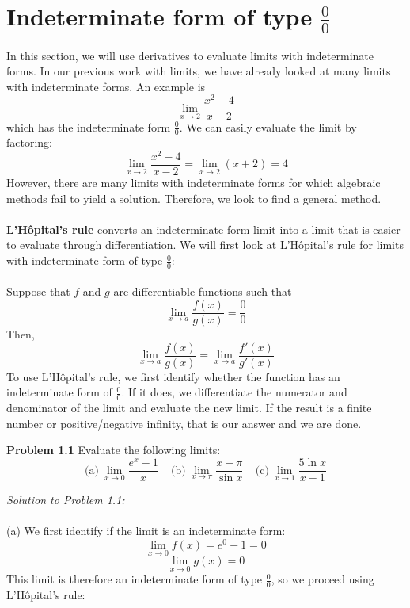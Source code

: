 \documentclass[11pt]{scrartcl}
\begin{document}
\maketitle
\noindent

\section{Indeterminate form of type $\frac{0}{0}$}
\noindent 
In this section, we will use derivatives to evaluate limits with indeterminate forms. In our previous work with limits, we have already looked at many limits with indeterminate forms. An example is 
$$\lim_{x \to 2} \frac{x^2-4}{x-2}$$
\noindent 
which has the indeterminate form $\frac{0}{0}$. 
We can easily evaluate the limit by factoring:
$$\lim_{x \to 2} \frac{x^2-4}{x-2}=\lim_{x \to 2}(x+2)=4$$
\noindent 
However, there are many limits with indeterminate forms for which algebraic methods fail to yield a solution. Therefore, we look to find a general method. \\
\\
\noindent 
\textbf{L'Hôpital's rule} converts an indeterminate form limit into a limit that is easier to evaluate through differentiation. We will first look at L'Hôpital's rule for limits with indeterminate form of type $\frac{0}{0}$: \\
\\
\noindent 
Suppose that $f$ and $g$ are differentiable functions such that 
$$\lim_{x \to a}\frac{f(x)}{g(x)}=\frac{0}{0}$$
Then,  
$$\lim_{x \to a}\frac{f(x)}{g(x)}=\lim_{x \to a}\frac{f'(x)}{g'(x)}$$
\noindent 
To use L'Hôpital's rule, we first identify whether the function has an indeterminate form of $\frac{0}{0}$. If it does, we differentiate the numerator and denominator of the limit and evaluate the new limit. If the result is a finite number or positive/negative infinity, that is our answer and we are done. 
\begin{tcolorbox}
[colback=purple!5!white,colframe=purple!75!black]
\textbf{Problem 1.1} Evaluate the following limits: 
$$\text{(a)} \ \lim_{x \to 0} \frac{e^x-1}{x} \ \ \ \ \ \text{(b)} \ \lim_{x \to \pi} \frac{x- \pi}{\sin x} \ \ \ \ \ \text{(c)} \ \lim_{x \to 1} \frac{5 \ln x}{x-1}$$
\end{tcolorbox}
\noindent 
\textit{Solution to Problem 1.1:} \\
\\
\noindent 
(a) We first identify if the limit is an indeterminate form: 
$$\lim_{x \to 0}f(x)=e^0-1=0$$
$$\lim_{x \to 0}g(x)=0$$
\noindent 
This limit is therefore an indeterminate form of type $\frac{0}{0}$, so we proceed using L'Hôpital's rule: 
\end{document}
